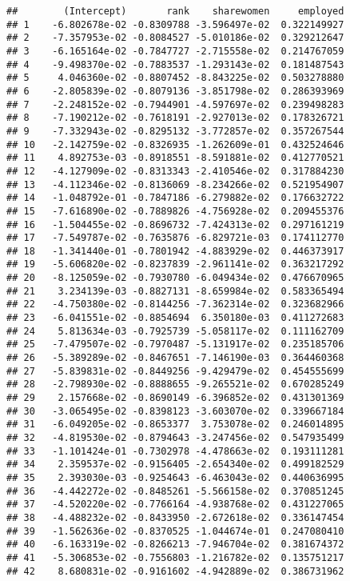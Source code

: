 \documentclass[
]{article}
\begin{document}
\begin{verbatim}
##        (Intercept)       rank    sharewomen     employed
## 1    -6.802678e-02 -0.8309788 -3.596497e-02  0.322149927
## 2    -7.357953e-02 -0.8084527 -5.010186e-02  0.329212647
## 3    -6.165164e-02 -0.7847727 -2.715558e-02  0.214767059
## 4    -9.498370e-02 -0.7883537 -1.293143e-02  0.181487543
## 5     4.046360e-02 -0.8807452 -8.843225e-02  0.503278880
## 6    -2.805839e-02 -0.8079136 -3.851798e-02  0.286393969
## 7    -2.248152e-02 -0.7944901 -4.597697e-02  0.239498283
## 8    -7.190212e-02 -0.7618191 -2.927013e-02  0.178326721
## 9    -7.332943e-02 -0.8295132 -3.772857e-02  0.357267544
## 10   -2.142759e-02 -0.8326935 -1.262609e-01  0.432524646
## 11    4.892753e-03 -0.8918551 -8.591881e-02  0.412770521
## 12   -4.127909e-02 -0.8313343 -2.410546e-02  0.317884230
## 13   -4.112346e-02 -0.8136069 -8.234266e-02  0.521954907
## 14   -1.048792e-01 -0.7847186 -6.279882e-02  0.176632722
## 15   -7.616890e-02 -0.7889826 -4.756928e-02  0.209455376
## 16   -1.504455e-02 -0.8696732 -7.424313e-02  0.297161219
## 17   -7.549787e-02 -0.7635876 -6.829721e-03  0.174112770
## 18   -1.341440e-01 -0.7801942 -4.883929e-02  0.446373917
## 19   -5.606820e-02 -0.8237839 -2.961141e-02  0.363217292
## 20   -8.125059e-02 -0.7930780 -6.049434e-02  0.476670965
## 21    3.234139e-03 -0.8827131 -8.659984e-02  0.583365494
## 22   -4.750380e-02 -0.8144256 -7.362314e-02  0.323682966
## 23   -6.041551e-02 -0.8854694  6.350180e-03  0.411272683
## 24    5.813634e-03 -0.7925739 -5.058117e-02  0.111162709
## 25   -7.479507e-02 -0.7970487 -5.131917e-02  0.235185706
## 26   -5.389289e-02 -0.8467651 -7.146190e-03  0.364460368
## 27   -5.839831e-02 -0.8449256 -9.429479e-02  0.454555699
## 28   -2.798930e-02 -0.8888655 -9.265521e-02  0.670285249
## 29    2.157668e-02 -0.8690149 -6.396852e-02  0.431301369
## 30   -3.065495e-02 -0.8398123 -3.603070e-02  0.339667184
## 31   -6.049205e-02 -0.8653377  3.753078e-02  0.246014895
## 32   -4.819530e-02 -0.8794643 -3.247456e-02  0.547935499
## 33   -1.101424e-01 -0.7302978 -4.478663e-02  0.193111281
## 34    2.359537e-02 -0.9156405 -2.654340e-02  0.499182529
## 35    2.393030e-03 -0.9254643 -6.463043e-02  0.440636995
## 36   -4.442272e-02 -0.8485261 -5.566158e-02  0.370851245
## 37   -4.520220e-02 -0.7766164 -4.938768e-02  0.431227065
## 38   -4.488232e-02 -0.8433950 -2.672618e-02  0.336147454
## 39   -1.562636e-02 -0.8370525 -1.044674e-01  0.247080410
## 40   -6.163319e-02 -0.8266213 -7.946704e-02  0.381674372
## 41   -5.306853e-02 -0.7556803 -1.216782e-02  0.135751217
## 42    8.680831e-02 -0.9161602 -4.942889e-02  0.386731962

\end{verbatim}
\end{document}
